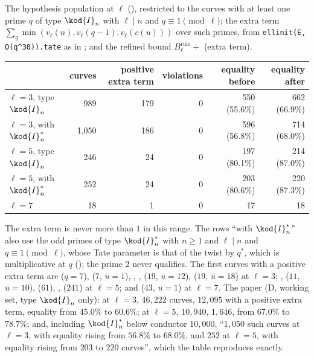 \begin{sloppypar}
\begin{example}\label{ex:computation:repro-tam}
The hypothesis population at $\ell$ (), restricted to the curves with at least one prime $q$ of type $\kod{I}_n$ with $\ell\mid n$ and
$q\equiv1\pmod\ell$; the extra term $\sum_q\min(v_\ell(n),v_\ell(q-1),v_\ell(c(u)))$ over such primes, from \texttt{ellinit(E, O(q\^{}30)).tate} as in
; and the refined bound $B^{\mathrm{rule}}_\ell+$ (extra term).
\begin{center}\footnotesize
\begin{tabular}{lrrrrr}
\toprule
& curves & positive extra term & violations & equality before & equality after\\
\midrule
$\ell=3$, type $\kod{I}_n$ & 989 & 179 & 0 & 550 (55.6\%) & 662 (66.9\%)\\
$\ell=3$, with $\kod{I}_n^*$ & 1,050 & 186 & 0 & 596 (56.8\%) & 714 (68.0\%)\\
$\ell=5$, type $\kod{I}_n$ & 246 & 24 & 0 & 197 (80.1\%) & 214 (87.0\%)\\
$\ell=5$, with $\kod{I}_n^*$ & 252 & 24 & 0 & 203 (80.6\%) & 220 (87.3\%)\\
$\ell=7$ & 18 & 1 & 0 & 17 & 18\\
\bottomrule
\end{tabular}
\end{center}
The extra term is never more than $1$ in this range. The rows ``with $\kod{I}_n^*$'' also use the odd primes of type $\kod{I}_n^*$ with $n\ge1$ and $\ell\mid n$ and $q\equiv1\pmod\ell$,
whose Tate parameter is that of the twist by $q^*$, which is multiplicative at $q$ (); the prime $2$ never qualifies. The first
curves with a positive extra term are  ($q=7$),  ($7$, $\bar u=1$), , ,  ($19$, $\bar u=12$), 
($19$, $\bar u=18$) at $\ell=3$; ,  ($11$, $\bar u=10$),  ($61$), ,  ($241$) at $\ell=5$; and 
($43$, $\bar u=1$) at $\ell=7$. The paper (D, working set, type $\kod{I}_n$ only): at $\ell=3$, $46{,}222$ curves, $12{,}095$ with a positive extra term, equality from
$45.0\%$ to $60.6\%$; at $\ell=5$, $10{,}940$, $1{,}646$, from $67.0\%$ to $78.7\%$; and, including $\kod{I}_n^*$ below conductor $10{,}000$, ``$1{,}050$ such curves at $\ell=3$, with
equality rising from $56.8\%$ to $68.0\%$, and $252$ at $\ell=5$, with equality rising from $203$ to $220$ curves'', which the table reproduces exactly.
\end{example}


\end{sloppypar}
